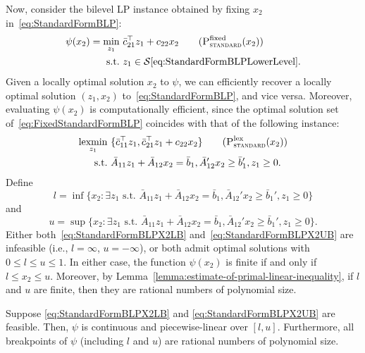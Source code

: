 \documentclass[runningheads,orivec]{llncs}
\newcommand{\MacroColor}[1]{#1}
\DeclareMathOperator*{\lexmin}{\MacroColor{lexmin}}
\newcommand{\OptSolSet}{\MacroColor{\mathcal{S}}}
\newcommand{\PartialOptValFunc}{\MacroColor{\psi}}
\begin{document}
\begin{appendix}
Now, consider the bilevel LP instance obtained by fixing $x_2$ in~\eqref{eq:StandardFormBLP}:
\begin{align}
\PartialOptValFunc(x_2) =
\min_{z_1} \ &
\bar{c}_{2 1}^{\top} z_1 + c_{2 2} x_2
\tag{$\textsc{P}_{\textsc{standard}}^{\textrm{fixed}}(x_2)$}
\label{eq:FixedStandardFormBLP}
\\
\text{s.t.} \
&
z_1 \in 
\OptSolSet\eqref{eq:StandardFormBLPLowerLevel}.
\notag
\end{align}
Given a locally optimal solution $x_2$ to $\PartialOptValFunc$, we can efficiently recover a locally optimal solution $(z_1, x_2)$ to~\eqref{eq:StandardFormBLP}, and vice versa.
Moreover, evaluating $\PartialOptValFunc(x_2)$ is computationally efficient, since the optimal solution set of~\eqref{eq:FixedStandardFormBLP} coincides with that of the following instance:
\begin{align}
\lexmin_{z_1} \ &
\{ \bar{c}_{1 1}^{\top} z_1, \bar{c}_{2 1}^{\top} z_1 + c_{2 2} x_2 \}
\tag{$\textsc{P}_{\textsc{standard}}^{\textrm{lex}}(x_2)$}
\label{eq:LexStandardFormBLP}
\\
\text{s.t.} \
&
\bar{A}_{1 1} z_1 + \bar{A}_{1 2} x_2 = \bar{b}_1,
\bar{A}_{1 2}' x_2 \ge \bar{b}_1',
z_1 \ge 0.
\notag
\end{align}
Define
\begin{equation}
l = \inf\{ x_2 : \exists z_1 \text{ s.t. } \bar{A}_{1 1} z_1 + \bar{A}_{1 2} x_2 = \bar{b}_1, \bar{A}_{1 2}' x_2 \ge \bar{b}_1', z_1 \ge 0 \}
\label{eq:StandardFormBLPX2LB}
\end{equation}
and
\begin{equation}
u = \sup\{ x_2 : \exists z_1 \text{ s.t. } \bar{A}_{1 1} z_1 + \bar{A}_{1 2} x_2 = \bar{b}_1, \bar{A}_{1 2}' x_2 \ge \bar{b}_1', z_1 \ge 0 \}.
\label{eq:StandardFormBLPX2UB}
\end{equation}
Either both~\eqref{eq:StandardFormBLPX2LB} and~\eqref{eq:StandardFormBLPX2UB} are infeasible (i.e., $l = \infty$, $u = -\infty$), or both admit optimal solutions with $0 \le l \le u \le 1$.
In either case, the function $\PartialOptValFunc(x_2)$ is finite if and only if $l \le x_2 \le u$.
Moreover, by Lemma~\ref{lemma:estimate-of-primal-linear-inequality}, if $l$ and $u$ are finite, then they are rational numbers of polynomial size.

\begin{lemma}
\label{lemma:PiecewiseLinearityOfPartialValueFunction}
Suppose \eqref{eq:StandardFormBLPX2LB} and \eqref{eq:StandardFormBLPX2UB} are feasible.
Then, $\PartialOptValFunc$ is continuous and piecewise-linear over $[l, u]$.
Furthermore, all breakpoints of $\PartialOptValFunc$ (including $l$ and $u$) are rational numbers of polynomial size.
\end{lemma}


\end{appendix}
\end{document}
